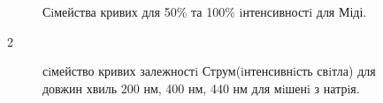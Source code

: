 \documentclass[a4paper,14pt]{extreport}
\begin{document}
\begin{figure}[h]
\caption{Сiмейства кривих для 50\% та 100\% iнтенсивностi для Міді.}
\label{ris1}
\end{figure}





\clearpage
\newpage
\begin{center}2\end{center}

\begin{figure}[h]
\caption{сiмейство кривих залежностi Струм(iнтенсивнiсть свiтла) для довжин хвиль 200 нм, 400 нм, 440 нм для мiшенi з натрiя.}
\label{ris7}
\end{figure}
\end{document}

